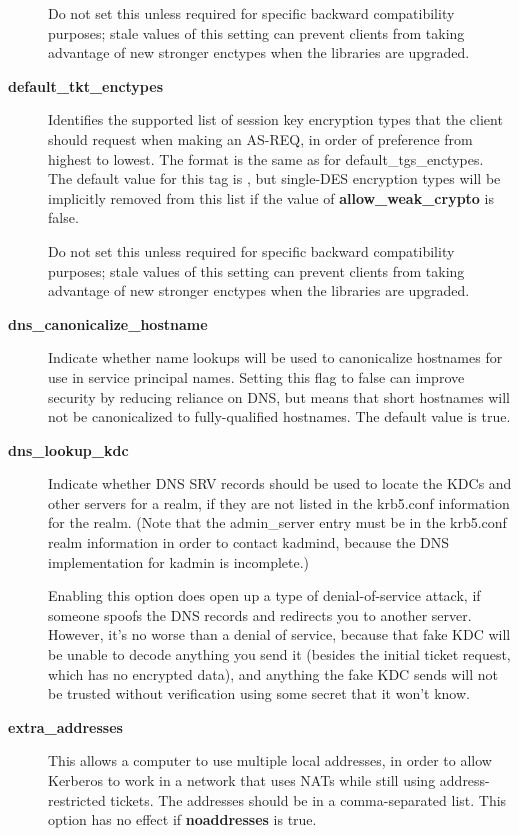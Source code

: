 \documentclass[letterpaper,10pt,english]{sphinxmanual}
\begin{document}
\begin{description}
Do not set this unless required for specific backward
compatibility purposes; stale values of this setting can prevent
clients from taking advantage of new stronger enctypes when the
libraries are upgraded.

\item[{\textbf{default\_tkt\_enctypes}}] \leavevmode
Identifies the supported list of session key encryption types that
the client should request when making an AS-REQ, in order of
preference from highest to lowest.  The format is the same as for
default\_tgs\_enctypes.  The default value for this tag is
, but single-DES encryption types will be implicitly
removed from this list if the value of \textbf{allow\_weak\_crypto} is
false.

Do not set this unless required for specific backward
compatibility purposes; stale values of this setting can prevent
clients from taking advantage of new stronger enctypes when the
libraries are upgraded.

\item[{\textbf{dns\_canonicalize\_hostname}}] \leavevmode
Indicate whether name lookups will be used to canonicalize
hostnames for use in service principal names.  Setting this flag
to false can improve security by reducing reliance on DNS, but
means that short hostnames will not be canonicalized to
fully-qualified hostnames.  The default value is true.

\item[{\textbf{dns\_lookup\_kdc}}] \leavevmode
Indicate whether DNS SRV records should be used to locate the KDCs
and other servers for a realm, if they are not listed in the
krb5.conf information for the realm.  (Note that the admin\_server
entry must be in the krb5.conf realm information in order to
contact kadmind, because the DNS implementation for kadmin is
incomplete.)

Enabling this option does open up a type of denial-of-service
attack, if someone spoofs the DNS records and redirects you to
another server.  However, it's no worse than a denial of service,
because that fake KDC will be unable to decode anything you send
it (besides the initial ticket request, which has no encrypted
data), and anything the fake KDC sends will not be trusted without
verification using some secret that it won't know.

\item[{\textbf{extra\_addresses}}] \leavevmode
This allows a computer to use multiple local addresses, in order
to allow Kerberos to work in a network that uses NATs while still
using address-restricted tickets.  The addresses should be in a
comma-separated list.  This option has no effect if
\textbf{noaddresses} is true.


\end{description}
\end{document}
